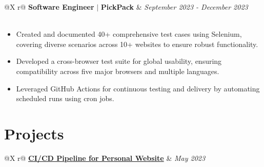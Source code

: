 \documentclass[a4paper,12pt]{article}
\begin{document}
\begin{tabularx}{\linewidth}{ @{}X r@{} }
    {\textbf{Software Engineer}} $\vert$ {\textbf{PickPack}} & \textit{September 2023 - December 2023} \\
     \\
\end{tabularx}
\begin{itemize}[nosep,leftmargin=*]
    \item Created and documented 40+ comprehensive test cases using Selenium, covering diverse scenarios across 10+ websites to ensure robust functionality.
    \item Developed a cross-browser test suite for global usability, ensuring compatibility across five major browsers and multiple languages.
    \item Leveraged GitHub Actions for continuous testing and delivery by automating scheduled runs using cron jobs.
\end{itemize}





\section{Projects}

\begin{tabularx}{\linewidth}{ @{}X r@{} }
    \href{https://ishan-next-react-website.vercel.app/}{\textbf{CI/CD Pipeline for Personal Website}} & \textit{May 2023} \\
     \\
\end{tabularx} 
\end{document}
